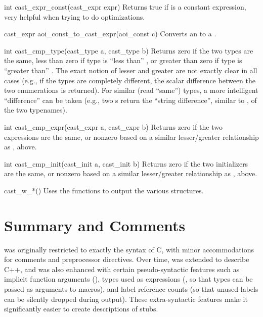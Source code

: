 \begin{cprototypelist}
  \item[int cast_expr_const(cast_expr expr)] Returns true if
   is a constant expression, very helpful when trying to do
  optimizations.

  \item[cast_expr aoi_const_to_cast_expr(aoi_const c)] Converts an
   to a .

  \item[int cast_cmp_type(cast_type a, cast_type b)] Returns zero if the two
  types are the same, less than zero if type  is ``less than''
  , or greater than zero if type  is ``greater
  than'' .  The exact notion of lesser and greater are not
  exactly clear in all cases (e.g., if the types are completely different, the
  scalar difference between the two  enumerations is
  returned).  For similar (read ``same'') types, a more intelligent
  ``difference'' can be taken (e.g., two s
  return the ``string difference'', similar to , of the two
  typenames).

  \item[int cast_cmp_expr(cast_expr a, cast_expr b)] Returns zero if the two
  expressions are the same, or nonzero based on a similar lesser/greater
  relationship as , above.

  \item[int cast_cmp_init(cast_init a, cast_init b)] Returns zero if the two
  initializers are the same, or nonzero based on a similar lesser/greater
  relationship as , above.

  \item[cast_w_*()] Uses the  functions to
  output the various \CAST{} structures.
\end{cprototypelist}



\section{Summary and Comments}
\label{sec:CAST:Summary and Comments}

\CAST{} was originally restricted to exactly the syntax of C, with minor
accommodations for comments and preprocessor directives.  Over time, \CAST{}
was extended to describe C++, and was also enhanced with certain
pseudo-syntactic features such as implicit function arguments
(), types used as expressions (,
so that types can be passed as arguments to macros), and label reference counts
(so that unused labels can be silently dropped during output).  These
extra-syntactic features make it significantly easier to create \PRESC{}
descriptions of stubs.

